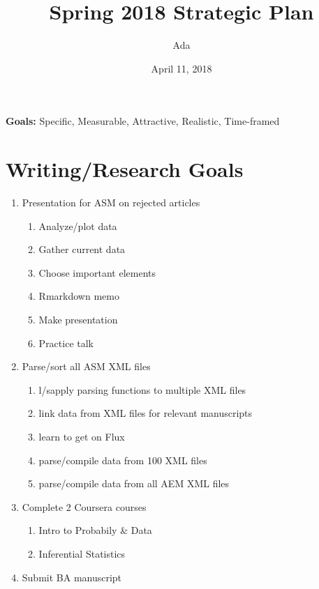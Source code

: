 \documentclass[]{article}
\title{Spring 2018 Strategic Plan}
\author{Ada}
\date{April 11, 2018}
\providecommand{\tightlist}{%
  \setlength{\itemsep}{0pt}\setlength{\parskip}{0pt}}
\begin{document}
\maketitle

\textbf{Goals:} Specific, Measurable, Attractive, Realistic, Time-framed

\section{Writing/Research Goals}\label{writingresearch-goals}

\begin{enumerate}
\def\labelenumi{\arabic{enumi}.}
\tightlist
\item
  Presentation for ASM on rejected articles

  \begin{enumerate}
  \def\labelenumii{\roman{enumii})}
  \tightlist
  \item
    Analyze/plot data
  \item
    Gather current data
  \item
    Choose important elements
  \item
    Rmarkdown memo
  \item
    Make presentation
  \item
    Practice talk
  \end{enumerate}
\item
  Parse/sort all ASM XML files

  \begin{enumerate}
  \def\labelenumii{\roman{enumii})}
  \tightlist
  \item
    l/sapply parsing functions to multiple XML files
  \item
    link data from XML files for relevant manuscripts
  \item
    learn to get on Flux
  \item
    parse/compile data from 100 XML files
  \item
    parse/compile data from all AEM XML files
  \end{enumerate}
\item
  Complete 2 Coursera courses

  \begin{enumerate}
  \def\labelenumii{\roman{enumii})}
  \tightlist
  \item
    Intro to Probabily \& Data
  \item
    Inferential Statistics
  \end{enumerate}
\item
  Submit BA manuscript


\end{enumerate}
\end{document}
